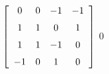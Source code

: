 {$\left[ \begin {array}{cccc} 0&0&-1&-1\\\noalign{\medskip}1&1&0&1
\\\noalign{\medskip}1&1&-1&0\\\noalign{\medskip}-1&0&1&0\end {array} \right] 
$} 
{$0$}

  

 

